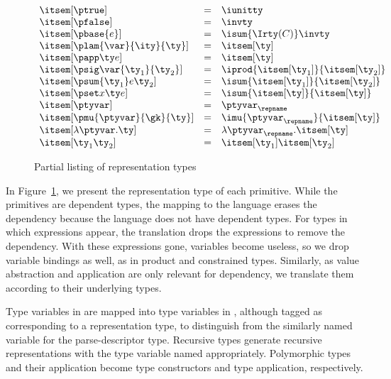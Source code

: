 \begin{figure}
\fbox{$\itsem[\ty] = \ity$}
\[
\begin{array}{lcl} 
\itsem[\ptrue] & = & \iunitty \\
\itsem[\pfalse] & = & \invty \\
\itsem[\pbase{e}] & = & \isum {\Irty(C)} \invty   \\
\itsem[\plam{\var}{\ity}{\ty}] & = & \itsem[\ty] \\
\itsem[\papp \ty e] & = & \itsem[\ty] \\
\itsem[\psig \var {\ty_1} {\ty_2}]  & = & \iprod {\itsem[\ty_1]} {\itsem[\ty_2]}    \\
\itsem[\psum {\ty_1} e {\ty_2}]     & = & \isum {\itsem[\ty_1]} {\itsem[\ty_2]} \\
\itsem[\pset x \ty e] & = & \isum {\itsem[\ty]}{\itsem[\ty]}\\
\itsem[\ptyvar] & = & \ptyvar_\repname \\
\itsem[\pmu{\ptyvar}{\gk}{\ty}] & = & \imu{\ptyvar_\repname}{\itsem[\ty]} \\
\itsem[\lambda \ptyvar.\ty]       & = & \lambda \ptyvar_\repname.\itsem[\ty] \\
\itsem[\ty_1 \ty_2]              & = & \itsem[\ty_1] \itsem[\ty_2] \\
\end{array}
\]
\caption{Partial listing of representation types}
\label{fig:rep-tys}
\end{figure}

In Figure~\ref{fig:rep-tys}, we present the representation type
of each \ddc{} primitive. While the primitives are
dependent types, the mapping to the \implang{} language erases the dependency because the \implang{} language does not have dependent types. For \ddc{} types in which expressions appear,
the translation drops the expressions to remove the dependency.
With these expressions gone, variables become useless, so we drop 
variable bindings as well, as in product and constrained types.
Similarly, as value abstraction and application are only relevant for
dependency, we translate them according to their underlying
types.

Type variables in \ddc{} are mapped into type variables in \fomega{},
although tagged as corresponding to a representation type, to
distinguish from the similarly named variable for the parse-descriptor
type. Recursive types generate recursive representations with the type
variable named appropriately. Polymorphic types and their application become type
constructors and type application, respectively.

